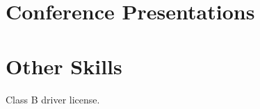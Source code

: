 \documentclass{article}
\begin{document}
\section{Conference Presentations }
 
 
\section{Other Skills}
\begin{description}[widest=Langauges]
\item[Other]  Class B driver license.
\end{description}
 
\end{document}
